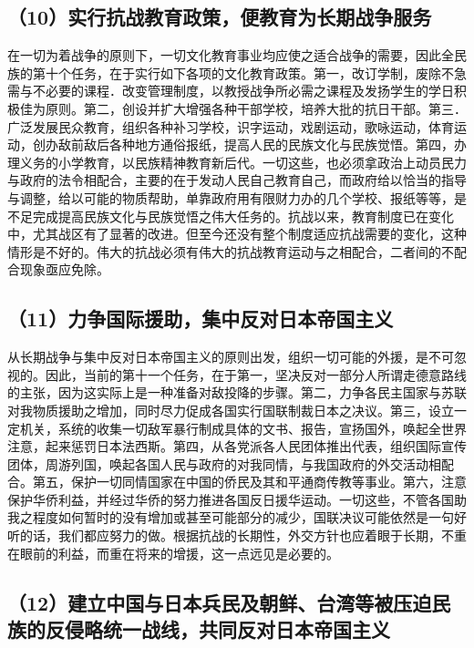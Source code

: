 \subsection{（10）实行抗战教育政策，便教育为长期战争服务}

在一切为着战争的原则下，一切文化教育事业均应使之适合战争的需要，因此全民族的第十个任务，在于实行如下各项的文化教育政策。第一，改订学制，废除不急需与不必要的课程．改变管理制度，以教授战争所必需之课程及发扬学生的学日积极佳为原则。第二，创设并扩大增强各种干部学校，培养大批的抗日干部。第三．广泛发展民众教育，组织各种补习学校，识字运动，戏剧运动，歌咏运动，体育运动，创办敌前敌后各种地方通俗报纸，提高人民的民族文化与民族觉悟。第四，办理义务的小学教育，以民族精神教育新后代。一切这些，也必须拿政治上动员民力与政府的法令相配合，主要的在于发动人民自己教育自己，而政府给以恰当的指导与调整，给以可能的物质帮助，单靠政府用有限财力办的几个学校、报纸等等，是不足完成提高民族文化与民族觉悟之伟大任务的。抗战以来，教育制度已在变化中，尤其战区有了显著的改进。但至今还没有整个制度适应抗战需要的变化，这种情形是不好的。伟大的抗战必须有伟大的抗战教育运动与之相配合，二者间的不配合现象亟应免除。

\subsection{（11）力争国际援助，集中反对日本帝国主义}

从长期战争与集中反对日本帝国主义的原则出发，组织一切可能的外援，是不可忽视的。因此，当前的第十一个任务，在于第一，坚决反对一部分人所谓走德意路线的主张，因为这实际上是一种准备对敌投降的步骤。第二，力争各民主国家与苏联对我物质援助之增加，同时尽力促成各国实行国联制裁日本之决议。第三，设立一定机关，系统的收集一切敌军暴行制成具体的文书、报告，宣扬国外，唤起全世界注意，起来惩罚日本法西斯。第四，从各党派各人民团体推出代表，组织国际宣传团体，周游列国，唤起各国人民与政府的对我同情，与我国政府的外交活动相配合。第五，保护一切同情国家在中国的侨民及其和平通商传教等事业。第六，注意保护华侨利益，并经过华侨的努力推进各国反日援华运动。一切这些，不管各国助我之程度如何暂时的没有增加或甚至可能部分的减少，国联决议可能依然是一句好听的话，我们都应努力的做。根据抗战的长期性，外交方针也应着眼于长期，不重在眼前的利益，而重在将来的增援，这一点远见是必要的。

\subsection{（12）建立中国与日本兵民及朝鲜、台湾等被压迫民族的反侵略统一战线，共同反对日本帝国主义}

